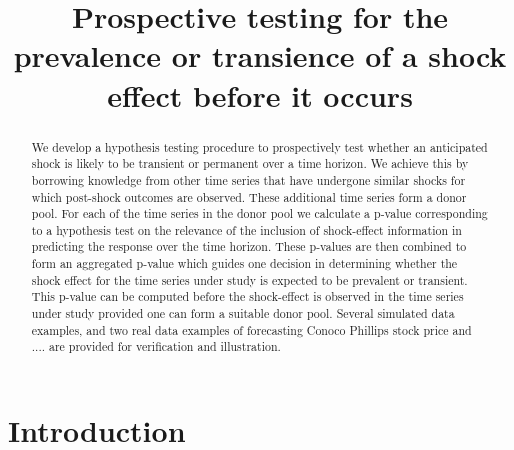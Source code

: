 \documentclass[11pt]{article}
\title{Prospective testing for the prevalence or transience of a shock effect before it occurs}
\author{}
\date{}
\theoremstyle{definition}
\begin{document}
\maketitle


\begin{abstract}
We develop a hypothesis testing procedure to prospectively test whether an anticipated shock is likely to be transient or permanent over a time horizon. We achieve this by borrowing knowledge from other time series that have undergone similar shocks for which post-shock outcomes are observed. These additional time series form a donor pool. 
For each of the time series in the donor pool we calculate a p-value corresponding to a hypothesis test on the relevance of the inclusion of shock-effect information in predicting the response over the time horizon.
These p-values are then combined to form an aggregated p-value which guides one decision in determining whether the shock effect for the time series under study is expected to be prevalent or transient. This p-value can be computed before the shock-effect is observed in the time series under study provided one can form a suitable donor pool. Several simulated data examples, and two real data examples of forecasting Conoco Phillips stock price and .... are provided for verification and illustration.
\end{abstract}


\section{Introduction}
\end{document}
